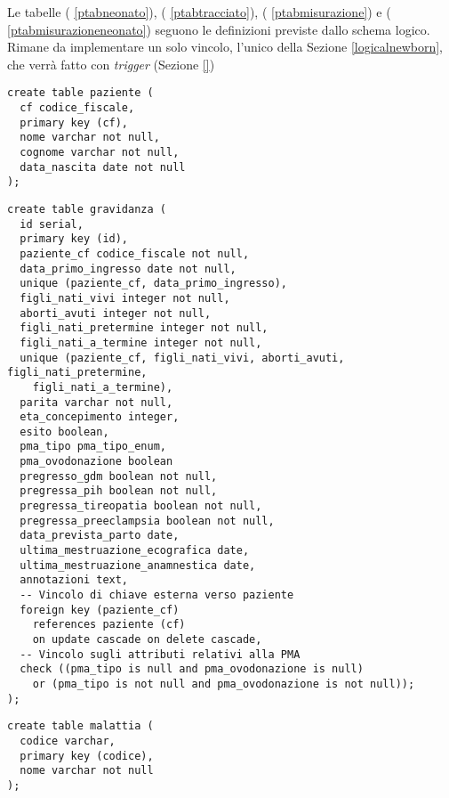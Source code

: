 Le tabelle  (\lstlistingname{} \ref{ptabneonato}),  (\lstlistingname{} \ref{ptabtracciato}),  (\lstlistingname{} \ref{ptabmisurazione}) e\linebreak {} (\lstlistingname{} \ref{ptabmisurazioneneonato}) seguono le definizioni previste dallo schema logico.
Rimane da implementare un solo vincolo, l'unico della Sezione \ref{logicalnewborn}, che verrà fatto con \emph{trigger} (Sezione \ref{})

\FloatBarrier

\begin{lstlisting}[float,caption={Definizione della tabella \tab{paziente}.},label=ptabpaziente]
create table paziente (
  cf codice_fiscale,
  primary key (cf),
  nome varchar not null,
  cognome varchar not null,
  data_nascita date not null
);
\end{lstlisting}

\begin{lstlisting}[float,caption={Definizione della tabella \tab{gravidanza}.},label=ptabgravidanza]
create table gravidanza (
  id serial,
  primary key (id),
  paziente_cf codice_fiscale not null,
  data_primo_ingresso date not null,
  unique (paziente_cf, data_primo_ingresso),
  figli_nati_vivi integer not null,
  aborti_avuti integer not null,
  figli_nati_pretermine integer not null,
  figli_nati_a_termine integer not null,
  unique (paziente_cf, figli_nati_vivi, aborti_avuti, figli_nati_pretermine,
    figli_nati_a_termine),
  parita varchar not null,
  eta_concepimento integer,
  esito boolean,
  pma_tipo pma_tipo_enum,
  pma_ovodonazione boolean
  pregresso_gdm boolean not null,
  pregressa_pih boolean not null,
  pregressa_tireopatia boolean not null,
  pregressa_preeclampsia boolean not null,
  data_prevista_parto date,
  ultima_mestruazione_ecografica date,
  ultima_mestruazione_anamnestica date,
  annotazioni text,
  -- Vincolo di chiave esterna verso paziente
  foreign key (paziente_cf)
    references paziente (cf)
    on update cascade on delete cascade,
  -- Vincolo sugli attributi relativi alla PMA
  check ((pma_tipo is null and pma_ovodonazione is null)
    or (pma_tipo is not null and pma_ovodonazione is not null));
);
\end{lstlisting}

\begin{lstlisting}[float,caption={Definizione della tabella \tab{malattia}.},label=ptabmalattia]
create table malattia (
  codice varchar,
  primary key (codice),
  nome varchar not null
);
\end{lstlisting}

